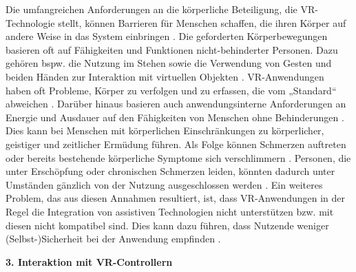 Die umfangreichen Anforderungen an die körperliche Beteiligung, die VR-Technologie stellt, können Barrieren für Menschen schaffen, die ihren Körper auf andere Weise in das System einbringen \citep{gerling_critical_2021}. Die geforderten Körperbewegungen basieren oft auf Fähigkeiten und Funktionen nicht-behinderter Personen. Dazu gehören bspw. die Nutzung im Stehen sowie die Verwendung von Gesten und beiden Händen zur Interaktion mit virtuellen Objekten \citep{wong_survey_2017}. VR-Anwendungen haben oft Probleme, Körper zu verfolgen und zu erfassen, die vom „Standard“ abweichen \citep{wong_survey_2017}. Darüber hinaus basieren auch anwendungsinterne Anforderungen an Energie und Ausdauer auf den Fähigkeiten von Menschen ohne Behinderungen \citep{wong_survey_2017}. Dies kann bei Menschen mit körperlichen Einschränkungen zu körperlicher, geistiger und zeitlicher Ermüdung führen. Als Folge können Schmerzen auftreten oder bereits bestehende körperliche Symptome sich verschlimmern \citep{creed_inclusive_2023}. Personen, die unter Erschöpfung oder chronischen Schmerzen leiden, könnten dadurch unter Umständen gänzlich von der Nutzung ausgeschlossen werden \citep{wong_survey_2017}. Ein weiteres Problem, das aus diesen Annahmen resultiert, ist, dass VR-Anwendungen in der Regel die Integration von assistiven Technologien nicht unterstützen bzw. mit diesen nicht kompatibel sind. Dies kann dazu führen, dass Nutzende weniger (Selbst-)Sicherheit bei der Anwendung empfinden \citep{creed_inclusive_2023}. 

{\normalfont \bfseries 3. Interaktion mit VR-Controllern} 

